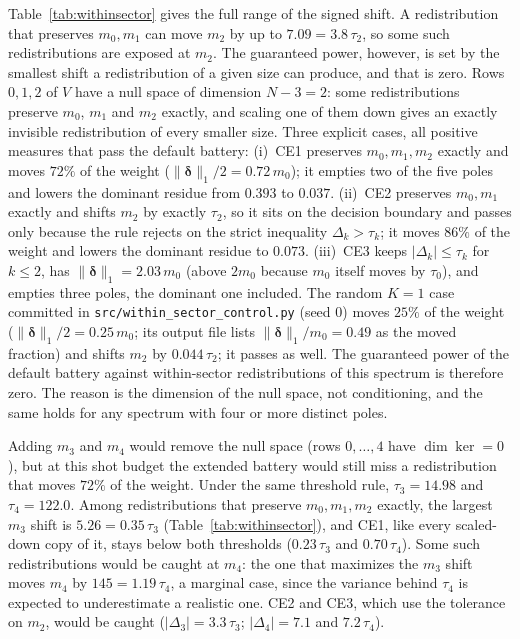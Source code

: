 \documentclass[submission, PhysCore]{SciPost}
\begin{document}
\begin{appendix}
Table~\ref{tab:withinsector} gives the full range of the signed shift. A redistribution that preserves $m_0,m_1$ can move $m_2$ by up to $7.09=3.8\,\tau_2$, so some such redistributions are exposed at $m_2$. The guaranteed power, however, is set by the smallest shift a redistribution of a given size can produce, and that is zero. Rows $0,1,2$ of $V$ have a null space of dimension $N-3=2$: some redistributions preserve $m_0$, $m_1$ and $m_2$ exactly, and scaling one of them down gives an exactly invisible redistribution of every smaller size. Three explicit cases, all positive measures that pass the default battery: (i)~CE1 preserves $m_0,m_1,m_2$ exactly and moves $72\%$ of the weight ($\|\bm{\delta}\|_1/2=0.72\,m_0$); it empties two of the five poles and lowers the dominant residue from $0.393$ to $0.037$. (ii)~CE2 preserves $m_0,m_1$ exactly and shifts $m_2$ by exactly $\tau_2$, so it sits on the decision boundary and passes only because the rule rejects on the strict inequality $\Delta_k>\tau_k$; it moves $86\%$ of the weight and lowers the dominant residue to $0.073$. (iii)~CE3 keeps $|\Delta_k|\le\tau_k$ for $k\le2$, has $\|\bm{\delta}\|_1=2.03\,m_0$ (above $2m_0$ because $m_0$ itself moves by $\tau_0$), and empties three poles, the dominant one included. The random $K=1$ case committed in \texttt{src/\allowbreak within\_sector\_control.py} (seed $0$) moves $25\%$ of the weight ($\|\bm{\delta}\|_1/2=0.25\,m_0$; its output file lists $\|\bm{\delta}\|_1/m_0=0.49$ as the moved fraction) and shifts $m_2$ by $0.044\,\tau_2$; it passes as well. The guaranteed power of the default battery against within-sector redistributions of this spectrum is therefore zero. The reason is the dimension of the null space, not conditioning, and the same holds for any spectrum with four or more distinct poles.

Adding $m_3$ and $m_4$ would remove the null space (rows $0,\dots,4$ have $\dim\ker=0$), but at this shot budget the extended battery would still miss a redistribution that moves $72\%$ of the weight. Under the same threshold rule, $\tau_3=14.98$ and $\tau_4=122.0$. Among redistributions that preserve $m_0,m_1,m_2$ exactly, the largest $m_3$ shift is $5.26=0.35\,\tau_3$ (Table~\ref{tab:withinsector}), and CE1, like every scaled-down copy of it, stays below both thresholds ($0.23\,\tau_3$ and $0.70\,\tau_4$). Some such redistributions would be caught at $m_4$: the one that maximizes the $m_3$ shift moves $m_4$ by $145=1.19\,\tau_4$, a marginal case, since the variance behind $\tau_4$ is expected to underestimate a realistic one. CE2 and CE3, which use the tolerance on $m_2$, would be caught ($|\Delta_3|=3.3\,\tau_3$; $|\Delta_4|=7.1$ and $7.2\,\tau_4$).


\end{appendix}
\end{document}
